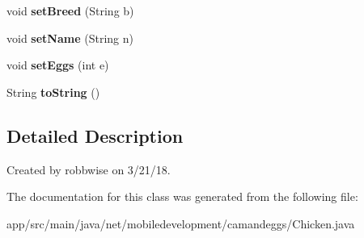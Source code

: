 \begin{DoxyCompactItemize}
void {\bfseries set\+Breed} (String b)
\item 
\mbox{\label{classnet_1_1mobiledevelopment_1_1camandeggs_1_1_chicken_a32d105215a6663638466b6686c46d846}} 
void {\bfseries set\+Name} (String n)
\item 
\mbox{\label{classnet_1_1mobiledevelopment_1_1camandeggs_1_1_chicken_ab670c03a86488a38865c8fcd6d291196}} 
void {\bfseries set\+Eggs} (int e)
\item 
\mbox{\label{classnet_1_1mobiledevelopment_1_1camandeggs_1_1_chicken_ab62786f60d359a4a3f045aa28e1f0c4d}} 
String {\bfseries to\+String} ()
\end{DoxyCompactItemize}


\subsection{Detailed Description}
Created by robbwise on 3/21/18. 

The documentation for this class was generated from the following file\+:\begin{DoxyCompactItemize}
\item 
app/src/main/java/net/mobiledevelopment/camandeggs/Chicken.\+java\end{DoxyCompactItemize}
